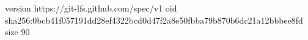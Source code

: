 version https://git-lfs.github.com/spec/v1
oid sha256:0bcb41f057191dd28ef4322bcd0d47f2a8e50fbba79b870b6dc21a12bbbee8fd
size 90
